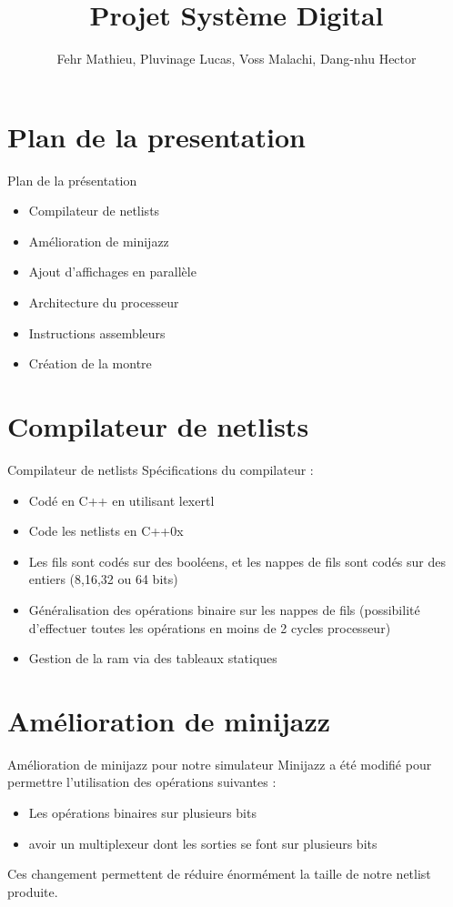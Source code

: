 \documentclass[11pt]{beamer}
\author{Fehr Mathieu, Pluvinage Lucas, Voss Malachi, Dang-nhu Hector}
\title{Projet Système Digital}
\begin{document}
\begin{frame}
\titlepage
\end{frame}


\section{Plan de la presentation}

\begin{frame}{Plan de la présentation}
\begin{itemize}
\item Compilateur de netlists
\item Amélioration de minijazz
\item Ajout d'affichages en parallèle
\item Architecture du processeur
\item Instructions assembleurs
\item Création de la montre
\end{itemize}
\end{frame}


\section{Compilateur de netlists}
\begin{frame}{Compilateur de netlists}
Spécifications du compilateur :
\begin{itemize}
\item{Codé en C++ en utilisant lexertl}
\item{Code les netlists en C++0x}
\item{Les fils sont codés sur des booléens, et les nappes de fils sont codés sur
  des entiers (8,16,32 ou 64 bits)}
\item{Généralisation des opérations binaire sur les nappes de fils (possibilité
    d'effectuer toutes les opérations en moins de 2 cycles processeur)}
\item{Gestion de la ram via des tableaux statiques}
\end{itemize}
\end{frame}


\section{Amélioration de minijazz}

\begin{frame}{Amélioration de minijazz pour notre simulateur}
  Minijazz a été modifié pour permettre l'utilisation des opérations suivantes :
  \begin{itemize}
  \item{Les opérations binaires sur plusieurs bits}
  \item{avoir un multiplexeur dont les sorties se font sur plusieurs bits}
  \end{itemize}

  Ces changement permettent de réduire énormément la taille de notre netlist produite.
\end{frame}
\end{document}
